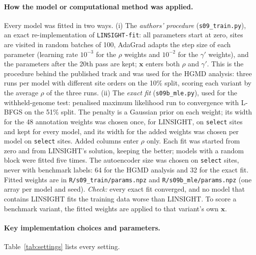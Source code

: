 \documentclass[11pt]{article}
\newcommand{\file}[1]{\nolinkurl{#1}}
\begin{document}
\paragraph{How the model or computational method was applied.} Every model was fitted in two ways.
(i) The \emph{authors' procedure} (\file{s09_train.py}), an exact re-implementation of \file{LINSIGHT-fit}:
all parameters start at zero, sites are visited in random batches of 100, AdaGrad
adapts the step size of each parameter (learning rate $10^{-3}$ for the $\rho$ weights and $10^{-2}$ for
the $\gamma'$ weights), and the parameters after the 20th pass are kept; $\mathbf{x}$ enters both $\rho$
and $\gamma'$. This is the procedure behind the published track and was used for the HGMD analysis: three
runs per model with different site orders on the 10\% split, scoring each variant by the average $\rho$ of
the three runs. (ii) The \emph{exact fit} (\file{s09b_mle.py}), used for the withheld-genome test:
penalised maximum likelihood run to convergence with L-BFGS on the 51\% split. The
penalty is a Gaussian prior on each weight; its width for the 48 annotation weights was chosen once, for
LINSIGHT, on \texttt{select} sites and kept for every model, and its width for the added weights was chosen
per model on \texttt{select} sites. Added columns enter $\rho$ only. Each fit was started from zero and from
LINSIGHT's solution, keeping the better; models with a random block were fitted five times. The
autoencoder size was chosen on \texttt{select} sites, never with benchmark labels: 64 for the HGMD analysis
and 32 for the exact fit. Fitted weights are in \file{R/s09_train/params.npz} and
\file{R/s09b_mle/params.npz} (one array per model and seed). \emph{Check:} every exact fit converged, and no
model that contains LINSIGHT fits the training data worse than LINSIGHT. To score a benchmark variant, the
fitted weights are applied to that variant's own $\mathbf{x}$.

\paragraph{Key implementation choices and parameters.} Table~\ref{tab:settings} lists every setting.
\end{document}
